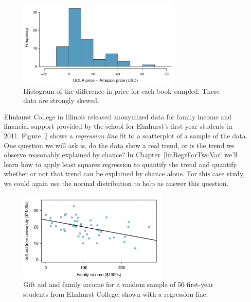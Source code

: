 \begin{figure}[ht]
\centering
\includegraphics[width=0.73\textwidth]{04/figures/textbooksS10/diffInTextbookPricesS10}
\caption{Histogram of the difference in price for each book sampled. These data are strongly skewed.\textA{\vspace{-3mm}}}
\label{diffInTextbookPricesS10_CLTsection}
\end{figure}

\textA{\pagebreak}

\begin{example}{Elmhurst College in Illinois released anonymized data for family income and financial support provided by the school for Elmhurst's first-year students in 2011. Figure~\ref{elmhurstScatterWLSROnly_CLTsection} shows a \emph{regression line} fit to a scatterplot of a sample of the data. One question we will ask is, do the data show a real trend, or is the trend we observe reasonably explained by chance?}
In Chapter~\ref{linRegrForTwoVar} we'll learn how to apply least squares regression to quantify the trend and quantify whether or not that trend can be explained by chance alone. For this case study, we could again use the normal distribution to help us answer this question.
\end{example}

\begin{figure}[ht]
\centering
\includegraphics[width=0.67\textwidth]{05/figures/elmhurstPlots/elmhurstScatterWLSROnly}
\caption{Gift aid and family income for a random sample of 50 first-year students from Elmhurst College, shown with a regression line.\textA{\vspace{-3mm}}}
\label{elmhurstScatterWLSROnly_CLTsection}
\end{figure}

